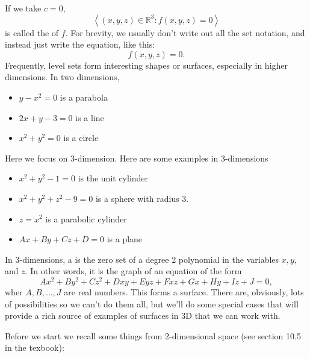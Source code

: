 \documentclass[10pt]{article}
\theoremstyle{definition}
\newcommand{\1}[1]{\textbf{1}_{\left[#1\right]}} %
\def\R{\mathbb{R}} %
\newcommand{\dempfcolor}[1]{{\color{RoyalBlue}#1}}
\newcommand{\demph}[1]{\dempfcolor{{\sl #1}}}
\begin{document}
If we take $c=0$,
\begin{equation*}
  \left\langle (x,y,z)\in \R^{3}: f(x,y,z)=0  \right\rangle 
\end{equation*}
is called the \demph{zero set} of $f$. For brevity, we usually don't write out all the set notation, and instead
just write the equation, like this:
\begin{equation*}
  f(x,y,z)=0.
\end{equation*}
Frequently, level sets form interesting shapes or surfaces, especially in higher dimensions. In two
dimensions,
\begin{itemize}
  \item $y-x^{2}=0$ is a parabola
  \item $2x+y-3=0$ is a line
  \item $x^{2}+y^{2}=0$ is a circle
\end{itemize}
Here we focus on 3-dimension. Here are some examples in 3-dimensions
\begin{itemize}
  \item $x^{2}+y^{2}-1=0$ is the unit cylinder
  \item $x^{2}+y^{2}+z^{2}-9=0$ is a sphere with radius 3.
  \item $z=x^{2}$ is a parabolic cylinder
  \item $Ax+By+Cz+D=0$ is a plane
\end{itemize}

In 3-dimensions, a \demph{quadric surface} is the zero set of a degree 2 polynomial in the variables
$x,y,$ and $z$. In other words, it is the graph of an equation of the form
\begin{equation*}
  Ax^{2}+By^{2}+Cz^{2}+Dxy+Eyz+Fxz+Gx+Hy+Iz+J = 0,
\end{equation*}
wher $A,B,\ldots,J$ are real numbers. This forms a surface. There are, obviously, lots of possibilities
so we can't do them all, but we'll do some special cases that will provide a rich source of examples of
surfaces in 3D that we can work with.

Before we start we recall some things from 2-dimensional space (see section 10.5 in the texbook):
\end{document}
